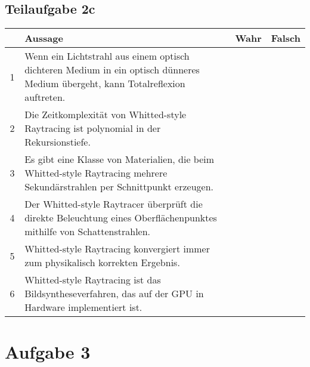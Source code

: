 \documentclass[a4paper]{scrartcl}
\begin{document}
\subsection*{Teilaufgabe 2c}
\begin{tabular}{cp{12cm}ll}\toprule
	~ & \textbf{Aussage} & \textbf{Wahr} & \textbf{Falsch} \\\midrule
	1 & Wenn ein Lichtstrahl aus einem optisch dichteren Medium in ein optisch dünneres Medium übergeht, kann Totalreflexion auftreten.
	  & \CheckedBox & \Square     \\
	2 & Die Zeitkomplexität von Whitted-style Raytracing ist polynomial in der Rekursionstiefe.
	  & \Square     & \CheckedBox \\
	3 & Es gibt eine Klasse von Materialien, die beim Whitted-style Raytracing mehrere Sekundärstrahlen per Schnittpunkt erzeugen.
	  & \CheckedBox & \Square     \\
	4 & Der Whitted-style Raytracer überprüft die direkte Beleuchtung eines Oberflächenpunktes mithilfe von Schattenstrahlen.
	  & \CheckedBox & \Square     \\
	5 & Whitted-style Raytracing konvergiert immer zum physikalisch korrekten Ergebnis.
	  & \Square     & \CheckedBox \\
	6 & Whitted-style Raytracing ist das Bildsyntheseverfahren, das auf der GPU in Hardware implementiert ist.
	  & \Square     & \CheckedBox \\\bottomrule
\end{tabular}

\section*{Aufgabe 3}
\end{document}
